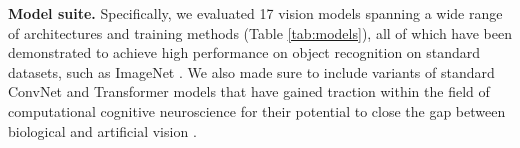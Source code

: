 \documentclass{article}
\begin{document}
\textbf{Model suite.} Specifically, we evaluated 17 vision models spanning a wide range of architectures and training methods (Table \ref{tab:models}), all of which have been demonstrated to achieve high performance on object recognition on standard datasets, such as ImageNet \cite{deng2009imagenet}. We also made sure to include variants of standard ConvNet and Transformer models that have gained traction within the field of computational cognitive neuroscience for their potential to close the gap between biological and artificial vision \cite{konkle2021beyond,fel2022aligning,kubilius2019brain,mehrer2021ecologically}.


\end{document}
